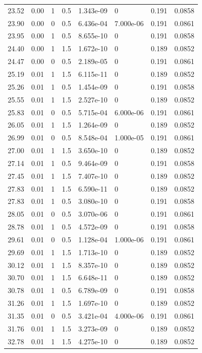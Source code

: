 \documentclass[preview]{standalone}
\begin{document}
{{{\begin{tabular}{L{1.2cm}C{1.2cm} C{0.3cm}C{0.5cm} C{1.4cm}C{1.4cm} C{1.4cm}C{1.4cm}}
  23.52  &  0.00  & 1     & 0.5 &  1.343e-09  & 0  & 0.191 &  0.0858   \\ 
  23.90  &  0.00  & 0     & 0.5 &  6.436e-04  & 7.000e-06  & 0.191 &  0.0861   \\ 
  23.95  &  0.00  & 1     & 0.5 &  8.655e-10  & 0  & 0.191 &  0.0858   \\ 
  24.40  &  0.00  & 1     & 1.5 &  1.672e-10  & 0  & 0.189 &  0.0852   \\ 
  24.47  &  0.00  & 0     & 0.5 &  2.189e-05  & 0  & 0.191 &  0.0861   \\ 
  25.19  &  0.01  & 1     & 1.5 &  6.115e-11  & 0  & 0.189 &  0.0852   \\ 
  25.26  &  0.01  & 1     & 0.5 &  1.454e-09  & 0  & 0.191 &  0.0858   \\ 
  25.55  &  0.01  & 1     & 1.5 &  2.527e-10  & 0  & 0.189 &  0.0852   \\ 
  25.83  &  0.01  & 0     & 0.5 &  5.715e-04  & 6.000e-06  & 0.191 &  0.0861   \\ 
  26.05  &  0.01  & 1     & 1.5 &  1.264e-09  & 0  & 0.189 &  0.0852   \\ 
  26.99  &  0.01  & 0     & 0.5 &  8.548e-04  & 1.000e-05  & 0.191 &  0.0861   \\ 
  27.00  &  0.01  & 1     & 1.5 &  3.650e-10  & 0  & 0.189 &  0.0852   \\ 
  27.14  &  0.01  & 1     & 0.5 &  9.464e-09  & 0  & 0.191 &  0.0858   \\ 
  27.45  &  0.01  & 1     & 1.5 &  7.407e-10  & 0  & 0.189 &  0.0852   \\ 
  27.83  &  0.01  & 1     & 1.5 &  6.590e-11  & 0  & 0.189 &  0.0852   \\ 
  27.83  &  0.01  & 1     & 0.5 &  3.080e-10  & 0  & 0.191 &  0.0858   \\ 
  28.05  &  0.01  & 0     & 0.5 &  3.070e-06  & 0  & 0.191 &  0.0861   \\ 
  28.78  &  0.01  & 1     & 0.5 &  4.572e-09  & 0  & 0.191 &  0.0858   \\ 
  29.61  &  0.01  & 0     & 0.5 &  1.128e-04  & 1.000e-06  & 0.191 &  0.0861   \\ 
  29.69  &  0.01  & 1     & 1.5 &  1.713e-10  & 0  & 0.189 &  0.0852   \\ 
  30.12  &  0.01  & 1     & 1.5 &  8.357e-10  & 0  & 0.189 &  0.0852   \\ 
  30.70  &  0.01  & 1     & 1.5 &  6.648e-11  & 0  & 0.189 &  0.0852   \\ 
  30.78  &  0.01  & 1     & 0.5 &  6.789e-09  & 0  & 0.191 &  0.0858   \\ 
  31.26  &  0.01  & 1     & 1.5 &  1.697e-10  & 0  & 0.189 &  0.0852   \\ 
  31.35  &  0.01  & 0     & 0.5 &  3.421e-04  & 4.000e-06  & 0.191 &  0.0861   \\ 
  31.76  &  0.01  & 1     & 1.5 &  3.273e-09  & 0  & 0.189 &  0.0852   \\ 
  32.78  &  0.01  & 1     & 1.5 &  4.275e-10  & 0  & 0.189 &  0.0852   \\ 
\hline 
\end{tabular} 

}}}
\end{document}
